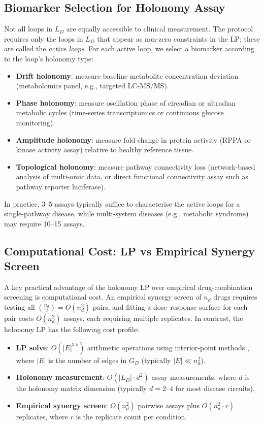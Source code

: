\subsection{Biomarker Selection for Holonomy Assay}

Not all loops in $L_D$ are equally accessible to clinical measurement.  The
protocol requires only the loops in $L_D$ that appear as non-zero constraints in
the LP; these are called the \emph{active loops}.  For each active loop, we
select a biomarker according to the loop's holonomy type:

\begin{itemize}
  \item \textbf{Drift holonomy}: measure baseline metabolite concentration
        deviation (metabolomics panel, e.g., targeted LC-MS/MS).
  \item \textbf{Phase holonomy}: measure oscillation phase of circadian or
        ultradian metabolic cycles (time-series transcriptomics or continuous
        glucose monitoring).
  \item \textbf{Amplitude holonomy}: measure fold-change in protein activity
        (RPPA or kinase activity assay) relative to healthy reference tissue.
  \item \textbf{Topological holonomy}: measure pathway connectivity loss
        (network-based analysis of multi-omic data, or direct functional
        connectivity assay such as pathway reporter luciferase).
\end{itemize}

In practice, 3--5 assays typically suffice to characterise the active loops for
a single-pathway disease, while multi-system diseases (e.g., metabolic syndrome)
may require 10--15 assays.

\subsection{Computational Cost: LP vs Empirical Synergy Screen}

A key practical advantage of the holonomy LP over empirical drug-combination
screening is computational cost.  An empirical synergy screen of $n_d$ drugs
requires testing all $\binom{n_d}{2} = O(n_d^2)$ pairs, and fitting a
dose--response surface for each pair costs $O(n_d^2)$ assays, each requiring
multiple replicates.  In contrast, the holonomy LP has the following cost
profile:

\begin{itemize}
  \item \textbf{LP solve}: $O(|E|^{3.5})$ arithmetic operations using interior-point
        methods \citep{Karmarkar1984}, where $|E|$ is the number of edges in
        $G_D$ (typically $|E| \ll n_d^2$).
  \item \textbf{Holonomy measurement}: $O(|L_D| \cdot d^2)$ assay measurements,
        where $d$ is the holonomy matrix dimension (typically $d = 2$--$4$ for
        most disease circuits).
  \item \textbf{Empirical synergy screen}: $O(n_d^2)$ pairwise assays plus
        $O(n_d^2 \cdot r)$ replicates, where $r$ is the replicate count per
        condition.
\end{itemize}

